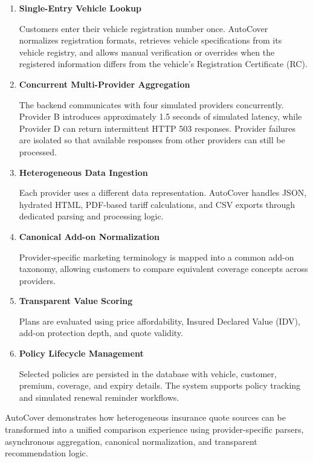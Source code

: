 \documentclass[11pt,a4paper]{article}
\begin{document}
\begin{enumerate}

    \item \textbf{Single-Entry Vehicle Lookup}

    Customers enter their vehicle registration number once.
    AutoCover normalizes registration formats, retrieves vehicle
    specifications from its vehicle registry, and allows manual
    verification or overrides when the registered information differs
    from the vehicle's Registration Certificate (RC).

    \item \textbf{Concurrent Multi-Provider Aggregation}

    The backend communicates with four simulated providers concurrently.
    Provider B introduces approximately 1.5 seconds of simulated latency,
    while Provider D can return intermittent HTTP 503 responses.
    Provider failures are isolated so that available responses from
    other providers can still be processed.

    \item \textbf{Heterogeneous Data Ingestion}

    Each provider uses a different data representation.
    AutoCover handles JSON, hydrated HTML, PDF-based tariff calculations,
    and CSV exports through dedicated parsing and processing logic.

    \item \textbf{Canonical Add-on Normalization}

    Provider-specific marketing terminology is mapped into a common
    add-on taxonomy, allowing customers to compare equivalent coverage
    concepts across providers.

    \item \textbf{Transparent Value Scoring}

    Plans are evaluated using price affordability, Insured Declared Value
    (IDV), add-on protection depth, and quote validity.

    \item \textbf{Policy Lifecycle Management}

    Selected policies are persisted in the database with vehicle,
    customer, premium, coverage, and expiry details. The system supports
    policy tracking and simulated renewal reminder workflows.

\end{enumerate}

\begin{infobox}[title={Core Engineering Objective}]
AutoCover demonstrates how heterogeneous insurance quote sources
can be transformed into a unified comparison experience using
provider-specific parsers, asynchronous aggregation, canonical
normalization, and transparent recommendation logic.
\end{infobox}
\end{document}
